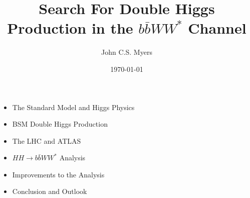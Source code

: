 \documentclass{beamer}
\title{Search For Double Higgs Production in the $b\bar{b}WW^{*}$ Channel}
\subtitle{}
\author[John C.S. Myers]{John C.S. Myers}
\institute[University of Oregon]{ University of Oregon}
\date{\today}
\newcommand*{\header}[1]{\fontsize{16}{8}\selectfont \textbf{{\color{MyPurple}{#1}}}}
\begin{document}
{  \begin{frame}[noframenumbering] \titlepage \end{frame} }


\begin{frame}
\begin{center}
\header{Overview}
\end{center}
\begin{itemize}
\item The Standard Model and Higgs Physics
\item BSM Double Higgs Production
\item The LHC and ATLAS
\item $HH\rightarrow{}b\bar{b}WW^{*}$ Analysis
\item Improvements to the Analysis
\item Conclusion and Outlook
\end{itemize}
\end{frame}
\end{document}
